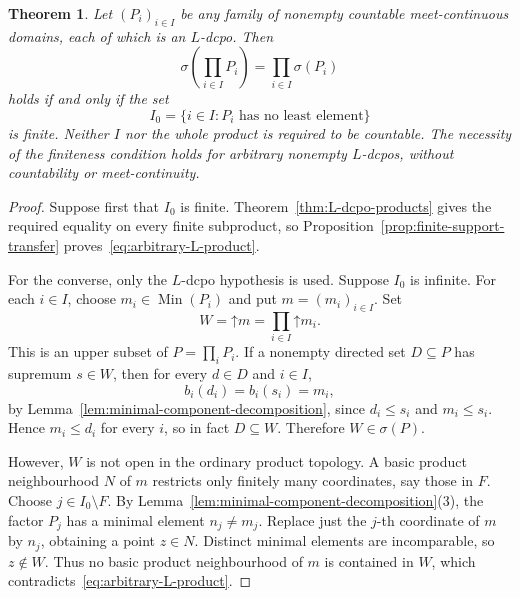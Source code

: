 \documentclass[11pt,reqno]{amsart}
\newtheorem{theorem}{Theorem}[section]
\theoremstyle{definition}
\theoremstyle{remark}
\numberwithin{equation}{section}
\newcommand{\up}[1]{\mathord{\uparrow}#1}
\newcommand{\Sc}{\sigma}
\begin{document}
\begin{theorem}\label{thm:arbitrary-L-products}
Let $(P_i)_{i\in I}$ be any family of nonempty countable meet-continuous domains, each of which is an $L$-dcpo. Then
\begin{equation}\label{eq:arbitrary-L-product}
 \Sc\!\left(\prod_{i\in I}P_i\right)
 =\prod_{i\in I}\Sc(P_i)
\end{equation}
holds if and only if the set
\[
 I_0=\{i\in I:P_i\text{ has no least element}\}
\]
is finite. Neither $I$ nor the whole product is required to be countable. The necessity of the finiteness condition holds for arbitrary nonempty $L$-dcpos, without countability or meet-continuity.
\end{theorem}
\begin{proof}
Suppose first that $I_0$ is finite. Theorem~\ref{thm:L-dcpo-products} gives the required equality on every finite subproduct, so Proposition~\ref{prop:finite-support-transfer} proves~\eqref{eq:arbitrary-L-product}.

For the converse, only the $L$-dcpo hypothesis is used. Suppose $I_0$ is infinite. For each $i\in I$, choose $m_i\in\operatorname{Min}(P_i)$ and put $m=(m_i)_{i\in I}$. Set
\begin{equation}\label{eq:minimal-component-product}
 W=\up m=\prod_{i\in I}\up m_i.
\end{equation}
This is an upper subset of $P=\prod_iP_i$. If a nonempty directed set $D\subseteq P$ has supremum $s\in W$, then for every $d\in D$ and $i\in I$,
\[
 b_i(d_i)=b_i(s_i)=m_i,
\]
by Lemma~\ref{lem:minimal-component-decomposition}, since $d_i\le s_i$ and $m_i\le s_i$. Hence $m_i\le d_i$ for every $i$, so in fact $D\subseteq W$. Therefore $W\in\Sc(P)$.

However, $W$ is not open in the ordinary product topology. A basic product neighbourhood $N$ of $m$ restricts only finitely many coordinates, say those in $F$. Choose $j\in I_0\setminus F$. By Lemma~\ref{lem:minimal-component-decomposition}\textup{(3)}, the factor $P_j$ has a minimal element $n_j\ne m_j$. Replace just the $j$-th coordinate of $m$ by $n_j$, obtaining a point $z\in N$. Distinct minimal elements are incomparable, so $z\notin W$. Thus no basic product neighbourhood of $m$ is contained in $W$, which contradicts~\eqref{eq:arbitrary-L-product}.
\end{proof}
\end{document}

